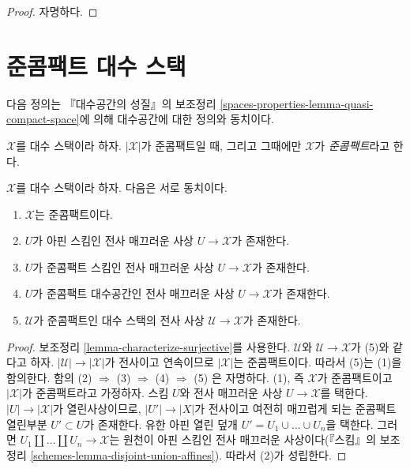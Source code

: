 \begin{proof}
자명하다.
\end{proof}












\section{준콤팩트 대수 스택}
\label{section-quasi-compact}

\noindent
다음 정의는 『대수공간의 성질』의 보조정리
\ref{spaces-properties-lemma-quasi-compact-space}에 의해
대수공간에 대한 정의와 동치이다.

\begin{definition}
\label{definition-quasi-compact}
$\mathcal{X}$를 대수 스택이라 하자.
$|\mathcal{X}|$가 준콤팩트일 때, 그리고 그때에만
$\mathcal{X}$가 {\it 준콤팩트}라고 한다.
\end{definition}

\begin{lemma}
\label{lemma-quasi-compact-stack}
$\mathcal{X}$를 대수 스택이라 하자. 다음은 서로 동치이다.
\begin{enumerate}
\item $\mathcal{X}$는 준콤팩트이다.
\item $U$가 아핀 스킴인 전사 매끄러운 사상
$U \to \mathcal{X}$가 존재한다.
\item $U$가 준콤팩트 스킴인 전사 매끄러운 사상
$U \to \mathcal{X}$가 존재한다.
\item $U$가 준콤팩트 대수공간인 전사 매끄러운 사상
$U \to \mathcal{X}$가 존재한다.
\item $\mathcal{U}$가 준콤팩트인 대수 스택의 전사 사상
$\mathcal{U} \to \mathcal{X}$가 존재한다.
\end{enumerate}
\end{lemma}

\begin{proof}
보조정리 \ref{lemma-characterize-surjective}를 사용한다.
$\mathcal{U}$와 $\mathcal{U} \to \mathcal{X}$가 (5)와 같다고 하자.
$|\mathcal{U}| \to |\mathcal{X}|$가 전사이고 연속이므로
$|\mathcal{X}|$는 준콤팩트이다. 따라서 (5)는 (1)을 함의한다. 함의
(2) $\Rightarrow$ (3) $\Rightarrow$ (4) $\Rightarrow$ (5)
은 자명하다. (1), 즉 $\mathcal{X}$가 준콤팩트이고
$|\mathcal{X}|$가 준콤팩트라고 가정하자. 스킴 $U$와 전사 매끄러운 사상
$U \to \mathcal{X}$를 택한다. $|U| \to |\mathcal{X}|$가 열린사상이므로,
$|U'| \to |X|$가 전사이고 여전히 매끄럽게 되는 준콤팩트 열린부분
$U' \subset U$가 존재한다. 유한 아핀 열린 덮개
$U' = U_1 \cup \ldots \cup U_n$을 택한다. 그러면
$U_1 \amalg \ldots \amalg U_n \to \mathcal{X}$는 원천이 아핀 스킴인
전사 매끄러운 사상이다(『스킴』의 보조정리
\ref{schemes-lemma-disjoint-union-affines}). 따라서 (2)가 성립한다.
\end{proof}

